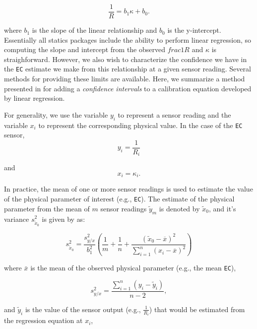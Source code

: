 \begin{equation}\label{eq:linear_calibration}
	\frac{1}{R}=b_1\kappa +b_0.  
\end{equation}

where $b_1$ is the slope of the linear relationship and $b_0$ is the y-intercept. Essentially all statics packages include the ability to perform linear regression, so computing the slope and intercept from the observed $frac{1}{R}$ and $\kappa$ is straighforward. However, we also wish to characterize the confidence we have in the \texttt{EC} estimate we make from this relationship at a given sensor reading. Several methods for providing these limits are available.  Here, we summarize a method presented in \cite{LAVAGNINI} for adding a \emph{confidence intervals} to a calibration equation developed by linear regression.

For generality, we use the variable $y_i$ to represent a sensor reading and the variable $x_i$ to represent the corresponding physical value.  In the case of the \texttt{EC} sensor, 
\begin{equation}
	y_i = \frac{1}{R_i}  
\end{equation}

and
\begin{equation}
	x_i = \kappa_i.  
\end{equation}


In practice, the mean of one or more sensor readings is used to estimate the value of the physical parameter of interest (e.g., \texttt{EC}).  The estimate of the physical parameter from the mean of $m$ sensor readings $\tilde{y}_m$ is denoted by $\tilde{x}_0$, and it's variance $s_{\tilde{x}_0}^{2}$ is given by \cite{LAVAGNINI} as: 

\begin{equation}\label{eq:var_readings}
	s_{\tilde{x}_0}^{2}=\frac{s_{y/x}^{2}}{b_{1}^{2}}\left (\frac{1}{m}+\frac{1}{n}+\frac{(\tilde{x}_0-\overline{x})^2}{\sum\limits_{i=1}^n \left ( x_i-\overline{x} \right )^2} \right )
\end{equation}

where $\bar{x}$ is the mean of the observed physical parameter (e.g., the mean \texttt{EC}),  

\begin{equation}\label{eq:regression_var}
	s_{y/x}^{2}=\frac{\sum\limits_{i=1}^n \left ( y_i-\tilde{y}_i \right )}{n-2},
\end{equation}

and $\tilde{y}_i$ is the value of the sensor output (e.g., $\frac{1}{R_i}$) that would be estimated from the regression equation at $x_i$,

